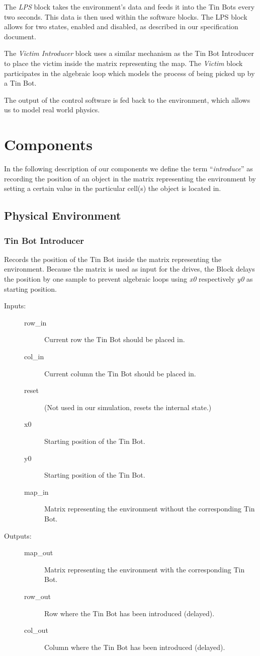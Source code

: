 \documentclass[a4paper,parskip,headheight=38pt]{scrartcl} %
\begin{document}
The \emph{LPS} block takes the environment's data and feeds it into the Tin Bots every two seconds. This data is then used within the software blocks. The LPS block allows for two states, enabled and disabled, as described in our specification document.

The \emph{Victim Introducer} block uses a similar mechanism as the Tin Bot Introducer to place the victim inside the matrix representing the map. The \emph{Victim} block participates in the algebraic loop which models the process of being picked up by a Tin Bot.

The output of the control software is fed back to the environment, which allows us to model real world physics.

\section{Components}
In the following description of our components we define the term \enquote{\emph{introduce}} as recording the position of an object in the matrix representing the environment by setting a certain value in the particular cell(s) the object is located in.

\subsection{Physical Environment}
\subsubsection{Tin Bot Introducer}
Records the position of the Tin Bot inside the matrix representing the environment. Because the matrix is used as input for the drives, the Block delays the position by one sample to prevent algebraic loops using \emph{x0} respectively \emph{y0} as starting position.
\begin{description}
\item[Inputs:] \hfill
	\begin{description}
	\item[row\_in] Current row the Tin Bot should be placed in.
	\item[col\_in] Current column the Tin Bot should be placed in.
	\item[reset] (Not used in our simulation, resets the internal state.)
	\item[x0] Starting position of the Tin Bot.
	\item[y0] Starting position of the Tin Bot.
	\item[map\_in] Matrix representing the environment without the corresponding Tin Bot.
	\end{description}
\item[Outputs:] \hfill
	\begin{description}
	\item[map\_out] Matrix representing the environment with the corresponding Tin Bot.
	\item[row\_out] Row where the Tin Bot has been introduced (delayed).
	\item[col\_out] Column where the Tin Bot has been introduced (delayed).
	\end{description}
\end{description}
\end{document}

